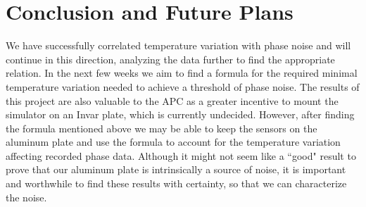 \documentclass[11 pt]{article}
\begin{document}
\section{Conclusion and Future Plans}

\indent\indent We have successfully correlated temperature variation with phase noise and will continue in this direction, analyzing the data further to find the appropriate relation. In the next few weeks we aim to find a formula for the required minimal temperature variation needed to achieve a threshold of phase noise. The results of this project are also valuable to the APC as a greater incentive to mount the simulator on an Invar plate, which is currently undecided. However, after finding the formula mentioned above we may be able to keep the sensors on the aluminum plate and use the formula to account for the temperature variation affecting recorded phase data. Although it might not seem like a ``good" result to prove that our aluminum plate is intrinsically a source of noise, it is important and worthwhile to find these results with certainty, so that we can characterize the noise.
\end{document}
